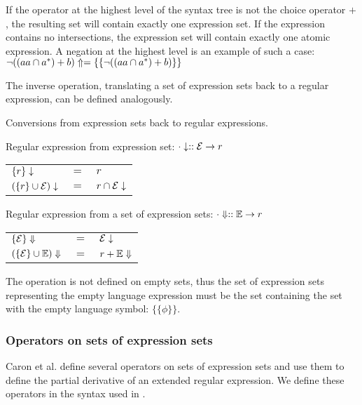 If the operator at the highest level of the syntax tree is not the choice
operator $+$, the resulting set will contain exactly one expression set. If the
expression contains no intersections, the expression set will contain exactly
one atomic expression. A negation at the highest level is an example of such a
case: $\neg((aa \cap a^*) + b)\Uparrow = \{\{\neg((aa \cap a^*) + b)\}\}$

The inverse operation, translating a set of expression sets back to a regular
expression, can be defined analogously.

\begin{defn}
   \label{defn-esets2re}
   Conversions from expression sets back to regular expressions.

   Regular expression from expression set: $\cdot\downarrow :: \mathcal{E} \to r$

   \begin{tabular}{lll}
      $\{r\}\downarrow$			& $=$	& $r$				\\
      $(\{r\} \cup \mathcal{E})\downarrow$	& $=$	& $r \cap \mathcal{E}\downarrow$	\\
   \end{tabular}

   Regular expression from a set of expression sets: $\cdot\Downarrow :: \mathbb{E} \to r$

   \begin{tabular}{lll}
      $\{\mathcal{E}\}\Downarrow$		& $=$	& $\mathcal{E}\downarrow$		\\
      $(\{\mathcal{E}\} \cup \mathbb{E})\Downarrow$	& $=$	& $r + \mathbb{E}\Downarrow$	\\
   \end{tabular}
\end{defn}

The operation is not defined on empty sets, thus the set of expression sets
representing the empty language expression must be the set containing the set
with the empty language symbol: $\{\{\phi\}\}$.

\subsubsection{Operators on sets of expression sets}

Caron et al. define several operators on sets of expression sets and use them to
define the partial derivative of an extended regular expression. We define these
operators in the syntax used in \cite{pdpat}.

